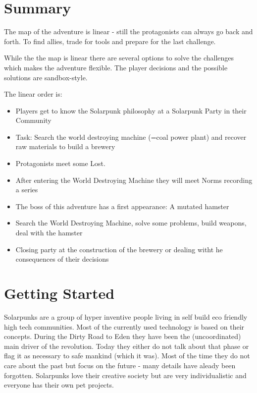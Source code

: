 \section{Summary}

The map of the adventure is linear - still the protagonists can always go back and forth. To find allies, trade for tools and prepare for the last challenge.

While the the map is linear there are several options to solve the challenges which makes the adventure flexible. The player decisions and the possible solutions are sandbox-style.

The linear order is:

\begin{itemize}
\item Players get to know the Solarpunk philosophy at a Solarpunk Party in their Community
\item Task: Search the world destroying machine (=coal power plant) and recover raw materials to build a brewery
\item Protagonists meet some Lost.
\item After entering the World Destroying Machine they will meet Norms recording a series
\item The boss of this adventure has a first appearance: A mutated hamster
\item Search the World Destroying Machine, solve some problems, build weapons, deal with the hamster
\item Closing party at the construction of the brewery or dealing witht he consequences of their decisions
\end{itemize}

\section{Getting Started}

\begin{sidebarBox}[title=Solarpunks]
Solarpunks are a group of hyper inventive people living in self build eco friendly high tech communities. Most of the currently used technology is based on their concepts. During the Dirty Road to Eden they have been the (uncoordinated) main driver of the revolution. Today they either do not talk about that phase or flag it as necessary to safe mankind (which it was). Most of the time they do not care about the past but focus on the future - many details have aleady been forgotten. Solarpunks love their creative society but are very individualistic and everyone has their own pet projects.
\end{sidebarBox}

